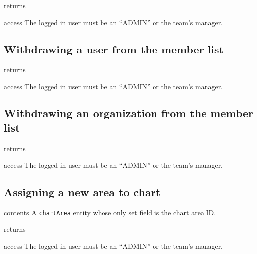 \begin{apidata}{returns}
  \begin{datalist}
  \end{datalist}
\end{apidata}
\begin{apidata}{access}
The logged in user must be an ``ADMIN'' or the team's manager.
\end{apidata}


\subsection{Withdrawing a user from the member list}

\begin{apidata}{returns}
  \begin{datalist}
  \end{datalist}
\end{apidata}
\begin{apidata}{access}
The logged in user must be an ``ADMIN'' or the team's manager.
\end{apidata}



\subsection{Withdrawing an organization from the member list}

\begin{apidata}{returns}
  \begin{datalist}
  \end{datalist}
\end{apidata}
\begin{apidata}{access}
The logged in user must be an ``ADMIN'' or the team's manager.
\end{apidata}


\subsection{Assigning a new area to chart}

\begin{apidata}{contents}
  A \texttt{chartArea} entity whose only set field is the chart area ID.
\end{apidata}
\begin{apidata}{returns}
  \begin{datalist}
  \end{datalist}
\end{apidata}
\begin{apidata}{access}
The logged in user must be an ``ADMIN'' or the team's manager.
\end{apidata}


